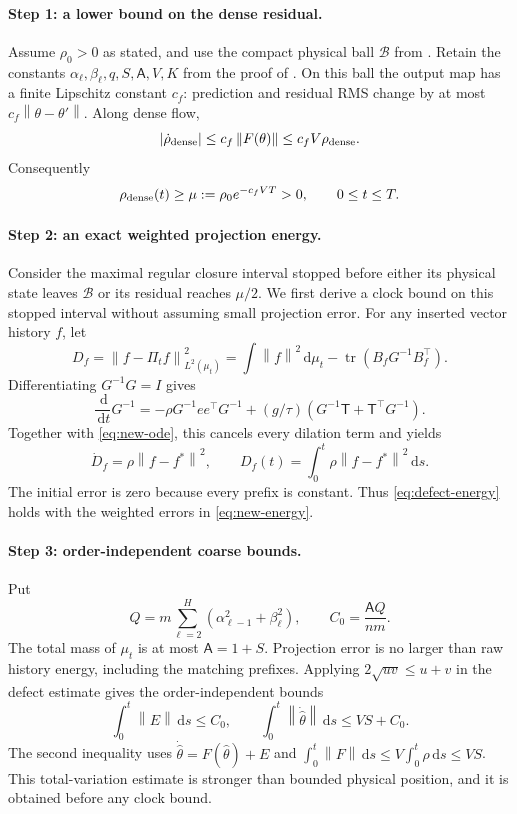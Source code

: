 \documentclass[11pt]{article}
\theoremstyle{definition}
\theoremstyle{remark}
\newcommand{\norm}[1]{\left\lVert #1\right\rVert}
\newcommand{\dd}{\,\mathrm{d}}
\begin{document}
\paragraph{Step 1: a lower bound on the dense residual.}
Assume $\rho_0>0$ as stated, and use the compact physical ball $\mathcal B$ from
.  Retain the constants
$\alpha_\ell,\beta_\ell,q,S,\mathsf A,V,K$ from the proof of .  On
this ball the output map has a finite Lipschitz constant $c_f$: prediction and
residual RMS change by at most $c_f\norm{\theta-\theta'}$.  Along dense flow,
\[
 |\dot\rho_{\rm dense}|\le c_f\norm{F(\theta)}
 \le c_fV\rho_{\rm dense}.
\]
Consequently
\begin{equation}
 \rho_{\rm dense}(t)\ge
 \mu:=\rho_0e^{-c_fVT}>0,\qquad 0\le t\le T.          \label{eq:dense-rho-lower}
\end{equation}

\paragraph{Step 2: an exact weighted projection energy.}
Consider the maximal regular closure interval stopped before either its
physical state leaves $\mathcal B$ or its residual reaches $\mu/2$.  We first
derive a clock bound on this stopped interval without assuming small projection
error.  For any inserted vector history $f$, let
\[
 D_f=\norm{f-\Pi_t f}_{L^2(\mu_t)}^2
 =\int\norm f^2\dd\mu_t-\operatorname{tr}(B_fG^{-1}B_f^\top).
\]
Differentiating $G^{-1}G=I$ gives
\[
 \frac{\dd}{\dd t}G^{-1}
 =-\rho G^{-1}ee^\top G^{-1}
 +(g/\tau)(G^{-1}\mathsf T+\mathsf T^\top G^{-1}).
\]
Together with \eqref{eq:new-ode}, this cancels every dilation term and yields
\begin{equation}
 \dot D_f=\rho\norm{f-f^*}^2,\qquad
 D_f(t)=\int_0^t\rho\norm{f-f^*}^2\dd s.             \label{eq:new-energy}
\end{equation}
The initial error is zero because every prefix is constant.  Thus
\eqref{eq:defect-energy} holds with the weighted errors in
\eqref{eq:new-energy}.

\paragraph{Step 3: order-independent coarse bounds.}
Put
\[
 Q=m\sum_{\ell=2}^H(\alpha_{\ell-1}^2+\beta_\ell^2),
 \qquad C_0=\frac{\mathsf A Q}{nm}.
\]
The total mass of $\mu_t$ is at most $\mathsf A=1+S$.  Projection error is no
larger than raw history energy, including the matching prefixes.  Applying
$2\sqrt{uv}\le u+v$ in the defect estimate gives the order-independent bounds
\begin{equation}
 \int_0^t\norm E\dd s\le C_0,\qquad
 \int_0^t\norm{\dot{\widehat\theta}}\dd s
 \le VS+C_0.                                         \label{eq:coarse-new}
\end{equation}
The second inequality uses $\dot{\widehat\theta}=F(\widehat\theta)+E$ and
$\int_0^t\norm F\dd s\le V\int_0^t\rho\dd s\le VS$.  This total-variation
estimate is stronger than bounded physical position, and it is obtained before
any clock bound.
\end{document}
